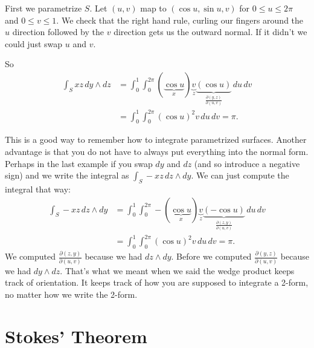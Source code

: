 \documentclass[12pt]{article}
\begin{document}
First we parametrize $S$.  Let $(u,v)$ map to $(\cos u, \sin u, v)$
for $0 \leq u \leq 2\pi$ and $0 \leq v \leq 1$.  We check that the
right hand rule, curling our fingers around the $u$ direction followed by
the $v$ direction gets us the outward normal.  If it didn't we could just
swap $u$ and $v$.

So
\begin{equation*}
\begin{split}
\int_S xz \, dy \wedge dz
& =
\int_0^1
\int_0^{2\pi}
(\underbrace{\cos u}_{x}) \underbrace{v}_{z}
\underbrace{( \cos u )}_{\frac{\partial (y,z)}{\partial (u,v)}}
\, du \, dv
\\
& =
\int_0^1
\int_0^{2\pi}
{(\cos u)}^2 v \, du \, dv
= \pi .
\end{split}
\end{equation*}

This is a good way to remember how to integrate parametrized surfaces.
Another advantage is that you do not have to always put everything into the normal form.
Perhaps in the last example if you swap $dy$ and $dz$ (and so introduce a negative sign)
and we write the integral as $\int_S -xz \, dz \wedge dy$.  We can just compute the integral
that way:
\begin{equation*}
\begin{split}
\int_S -xz \, dz \wedge dy
& =
\int_0^1
\int_0^{2\pi}
- (\underbrace{\cos u}_{x}) \underbrace{v}_{z}
\underbrace{( - \cos u )}_{\frac{\partial (z,y)}{\partial (u,v)}}
\, du \, dv
\\
& =
\int_0^1
\int_0^{2\pi}
{(\cos u)}^2 v \, du \, dv
= \pi .
\end{split}
\end{equation*}
We computed
$\frac{\partial (z,y)}{\partial (u,v)}$ because we had $dz \wedge dy$.
Before we computed
$\frac{\partial (y,z)}{\partial (u,v)}$ because we had $dy \wedge dz$.
That's what we meant when we said the wedge product keeps track of orientation.  It keeps track
of how you are supposed to integrate a 2-form, no matter how we write the 2-form.

\section*{Stokes' Theorem}
\end{document}
